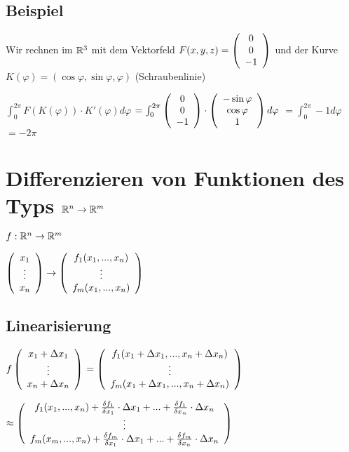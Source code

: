\renewcommand{\ldate}{2015-11-06}

\subsection{Beispiel}
Wir rechnen im $\mathbb{R}^3$ mit dem Vektorfeld $F(x,y,z) =   \left(  \begin{array}{c} 0\\0\\-1 \end{array}  \right)  $ und der Kurve $K(\varphi) = (\cos \varphi, \sin \varphi, \varphi)$ (Schraubenlinie) 

$\int_{0}^{2\pi} F(K(\varphi)) \cdot K'(\varphi) d\varphi$
$=\int_{0}^{2\pi}   \left(  \begin{array}{c} 0\\0\\-1 \end{array}  \right)   \cdot   \left(  \begin{array}{c} -\sin \varphi\\ \cos \varphi\\ 1 \end{array}  \right)   d\varphi$
$=\int_{0}^{2\pi} -1 d\varphi$
$=-2\pi$ 

\section{Differenzieren von Funktionen des Typs $\mathbb{R}^n \rightarrow \mathbb{R}^m$}
$ f:\mathbb{R}^n \rightarrow \mathbb{R}^m $

$  \left(  \begin{array}{c} x_1\\\vdots \\x_n \end{array}  \right)   \rightarrow   \left(  \begin{array}{c} f_1(x_1,...,x_n)\\\vdots\\f_m(x_1,...,x_n) \end{array}  \right)  $

\subsection{Linearisierung}
$f  \left(  \begin{array}{c} x_1 + \Delta x_1\\\vdots\\x_n + \Delta x_n\\ \end{array}  \right)  $
$=  \left(  \begin{array}{c} f_1(x_1 +\Delta x_1, ..., x_n+\Delta x_n)\\\vdots\\f_m(x_1 +\Delta x_1, ..., x_n+\Delta x_n) \end{array}  \right)  $ 

$\approx   \left(  \begin{array}{c} f_1(x_1, ..., x_n) + \frac{\delta f_1}{\delta x_1} \cdot \Delta x_1 + ... + \frac{\delta f_1}{\delta x_n} \cdot \Delta x_n \\ \vdots \\ f_m(x_m, ..., x_n) + \frac{\delta f_m}{\delta x_1} \cdot \Delta x_1 + ... + \frac{\delta f_m}{\delta x_n} \cdot \Delta x_n \end{array}  \right)  $


